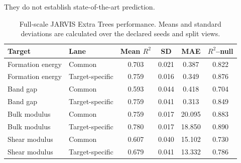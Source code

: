 \documentclass[11pt,a4paper,oneside]{report}
\begin{document}
They do not establish state-of-the-art prediction.



\begin{table}[H]



\centering



\caption{Full-scale JARVIS Extra Trees performance. Means and standard deviations are calculated over the declared seeds and split views.}



\label{tab:jarvis-extra-trees}



\begin{tabular}{l l S[table-format=1.3] S[table-format=1.3] S[table-format=2.3] S[table-format=1.3]}
\toprule
\textbf{Target}
&
\textbf{Lane}
&
{\textbf{Mean $R^2$}}
&
{\textbf{SD}}
&
{\textbf{MAE}}
&
{\textbf{$R^2$--null}}
\\
\midrule
Formation energy
&
Common
&
0.703
&
0.021
&
0.387
&
0.822
\\
Formation energy
&
Target-specific
&
0.759
&
0.016
&
0.349
&
0.876
\\
Band gap
&
Common
&
0.593
&
0.044
&
0.418
&
0.704
\\
Band gap
&
Target-specific
&
0.759
&
0.041
&
0.313
&
0.849
\\
Bulk modulus
&
Common
&
0.759
&
0.017
&
20.095
&
0.883
\\
Bulk modulus
&
Target-specific
&
0.780
&
0.017
&
18.850
&
0.890
\\
Shear modulus
&
Common
&
0.607
&
0.040
&
15.102
&
0.730
\\
Shear modulus
&
Target-specific
&
0.679
&
0.041
&
13.332
&
0.786
\\
\bottomrule
\end{tabular}



\end{table}
\end{document}
